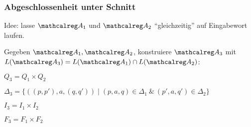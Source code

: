     \begin{frame}
      \frametitle{Abgeschlossenheit unter Schnitt}
      
      
      \par\smallskip
      Idee: lasse $\Aut{A}_1$ und $\Aut{A}_2$ "`gleichzeitig"' auf Eingabewort laufen.
      
      \par\smallskip
      Gegeben $\Aut{A}_1,\Aut{A}_2$,
      konstruiere $\Aut{A}_3$ mit $L(\Aut{A}_3) = L(\Aut{A}_1) \cap L(\Aut{A}_2)$:
      \begin{Itemize}
        \item
          $Q_3 = Q_1 \times Q_2$
        \item
          $\Delta_3 = \{((p,p'),a,(q,q')) \mid (p,a,q) \!\in\! \Delta_1 ~\&~ (p',a,q') \!\in\! \Delta_2\}$
        \item
          $I_3 = I_1 \times I_2$
        \item
          $F_3 = F_1 \times F_2$
          \Tafel
      \end{Itemize}
      
      \par\bigskip
      
      \par\bigskip

    \end{frame}

